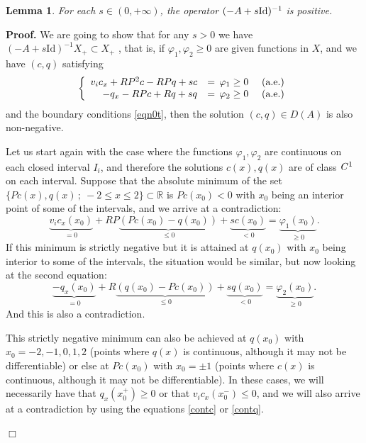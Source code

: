 \documentclass[a4paper]{article}
\newtheorem{lemma}[thm]{Lemma}
\newcommand{\R}{\ensuremath{\mathbb{R}}}
\def\cC{{\cal{C}}}
\def\cC{{\it{C}}}
\def\Id{\rm{Id}}
\def\Id{\mathrm{Id}}
\numberwithin{equation}{section}
\newenvironment{pf}{\vspace{0.5em}\noindent\textbf{Proof.} }{\quad \hfill $\Box$ \\ \vspace{0.2em}\\}
\begin{document}
\begin{lemma}\label{pos}
For each $s\in(0,+\infty)$, the operator $(-A+s{\rm{Id}})^{-1}$ is positive.
\end{lemma}
\begin{pf}
We are going to show that for any $s>0$ we have $(-A+s\Id)^{-1}X_+\subset X_+$ , that is, if $\varphi_1,\varphi_2\geq 0$ are given functions in $X$, and we have $(c,q)$ satisfying
\begin{equation*}%
\left\{\begin{array}{rll}
v_i c_x+RP^2c-RPq+s c&=\,\varphi_1\ge 0 &\hbox{ (a.e.)}\\
-q_x-RPc+Rq+s q&=\, \varphi_2\ge 0 &\hbox{ (a.e.)}
\end{array}
\right.
\end{equation*}
and the boundary conditions \eqref{eqn0t}, then the solution $(c,q)\in D(A)$ is also non-negative.

Let us start again with the case where the functions $\varphi_1,\varphi_2$ are continuous on each closed interval $I_i$, and therefore the solutions $c(x),q(x)$ are of class $\cC^1$ on each interval. Suppose that the absolute minimum of the set $\{Pc(x),q(x)\,;\ -2\le x\le2\}\subset\R$  is $Pc(x_0)<0$ with $x_0$ being an interior point of some of the intervals, and we arrive at a contradiction:
\begin{equation}\label{contc}
\underbrace{v_i c_x(x_0)}_{=0}+RP\underbrace{(Pc(x_0)-q(x_0))}_{\le 0}+ \underbrace{s c(x_0)}_{<0}=\underbrace{\varphi_1(x_0)}_{\ge 0}.
\end{equation}
If this minimum is strictly negative but it is attained at $q(x_0)$ with $x_0$ being interior to some of the intervals, the situation would be similar, but now looking at the second equation:
\begin{equation}\label{contq}
\underbrace{-q_x(x_0)}_{=0}+R\underbrace{(q(x_0)-Pc(x_0))}_{\le 0}+ \underbrace{s q(x_0)}_{<0}=\underbrace{\varphi_2(x_0)}_{\ge 0}.
\end{equation}
And this is also a contradiction.

This strictly negative minimum can also be achieved at $q(x_0)$ with $x_0=-2,-1,0,1,2$ (points where $q(x)$ is continuous, although it may not be differentiable) or else at  $Pc(x_0)$ with $x_0=\pm 1$ (points where $c(x)$ is continuous, although it may not be differentiable). In these cases, we will necessarily have that $q_x(x_0^+)\ge 0$ or that $v_ic_x(x_0^-)\leq 0$, and we will also arrive at a contradiction by using the equations \eqref{contc} or \eqref{contq}.


\end{pf}
\end{document}
